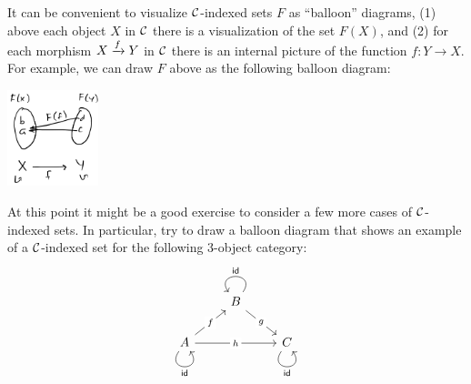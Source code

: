 \begin{itemize}
It can be convenient to visualize $\mathcal C$-indexed sets $F$ as 
``balloon'' diagrams, (1) above each object $X$ in $\mathcal C$ there is a visualization
of the set $F(X)$, and (2) for each morphism $X \xrightarrow{f} Y$
in $\mathcal C$ there is an internal picture of the function $f : Y \to X$. 
For example, we can draw $F$ above as the following balloon diagram:

\begin{center}
  \includegraphics[width=100px]{fig/balloon-0.png}
\end{center}



\end{itemize}

At this point it might be a good exercise to consider a few more 
cases of $\mathcal C$-indexed sets. In particular, try to 
draw a balloon diagram that shows an example of a $\mathcal C$-indexed set for the
following 3-object category:
\begin{equation}
\begin{tikzcd}
  & B \arrow[rd, "g" description] \arrow["\textsf{id}"', loop, distance=2em, in=125, out=55] &                                                               \\
A \arrow[rr, "h" description] \arrow[ru, "f" description] \arrow["\textsf{id}"', loop, distance=2em, in=305, out=235] &                                                                                          & C \arrow["\textsf{id}"', loop, distance=2em, in=305, out=235]
\end{tikzcd} 
\end{equation}



